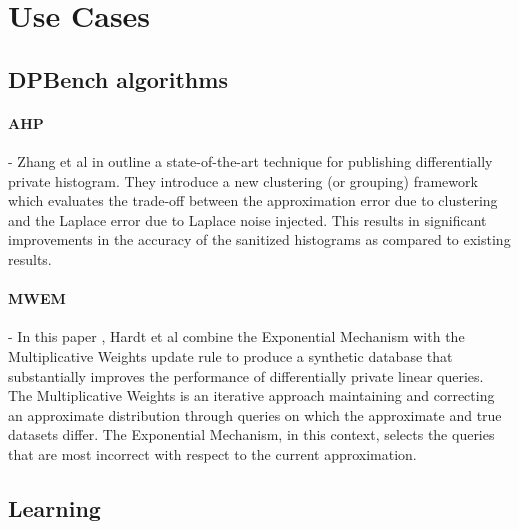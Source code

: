 
\section{Use Cases}
\subsection{DPBench algorithms}
\paragraph{\textbf{AHP}}- Zhang et al in \cite{AHP} outline a state-of-the-art technique for  publishing differentially private histogram.  They introduce a new clustering (or grouping) framework which evaluates 
the trade-off between the approximation error due to clustering
and the Laplace error due to Laplace noise injected. This results in significant improvements in the accuracy of the sanitized histograms as compared to existing results.

\paragraph{\textbf{MWEM}}- In this  paper \cite{MWEM}, Hardt et al  combine the Exponential Mechanism with the Multiplicative Weights update rule \cite{MW} to produce a synthetic database that
substantially improves the performance of differentially private linear queries. The Multiplicative Weights is an iterative approach  maintaining and correcting an approximate distribution through queries  on which the approximate and true datasets
differ. The Exponential Mechanism, in this context, selects the queries that are most incorrect with respect to the current approximation. 
\subsection{Learning}\label{Learning}
